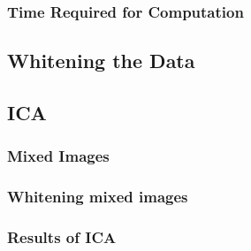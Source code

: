 \documentclass[11pt, oneside]{article}
\begin{document}
\subsubsection{Time Required for Computation}

\subsection{Whitening the Data}

\subsection{ICA}

\subsubsection{Mixed Images}

\subsubsection{Whitening mixed images}

\subsubsection{Results of ICA}
\end{document}
